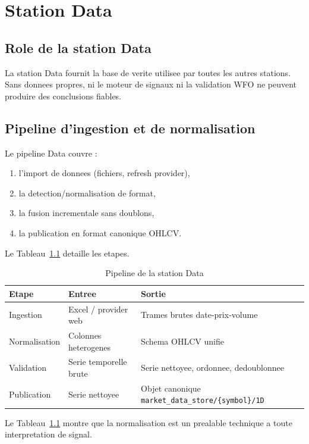 \chapter{Station Data}

\section{Role de la station Data}
La station Data fournit la base de verite utilisee par toutes les autres
stations. Sans donnees propres, ni le moteur de signaux ni la validation WFO ne
peuvent produire des conclusions fiables.

\section{Pipeline d'ingestion et de normalisation}
Le pipeline Data couvre :
\begin{enumerate}
\item l'import de donnees (fichiers, refresh provider),
\item la detection/normalisation de format,
\item la fusion incrementale sans doublons,
\item la publication en format canonique OHLCV.
\end{enumerate}

Le Tableau~\ref{tab:data-pipeline} detaille les etapes.

\begin{table}[H]
\centering
\caption{Pipeline de la station Data}
\label{tab:data-pipeline}
\begin{tabular}{p{3cm}p{4cm}p{7.4cm}}
\toprule
\textbf{Etape} & \textbf{Entree} & \textbf{Sortie} \\
\midrule
Ingestion & Excel / provider web & Trames brutes date-prix-volume \\
Normalisation & Colonnes heterogenes & Schema OHLCV unifie \\
Validation & Serie temporelle brute & Serie nettoyee, ordonnee, dedoublonnee \\
Publication & Serie nettoyee & Objet canonique \texttt{market\_data\_store/\{symbol\}/1D} \\
\bottomrule
\end{tabular}
\end{table}

Le Tableau~\ref{tab:data-pipeline} montre que la normalisation est un prealable
technique a toute interpretation de signal.

